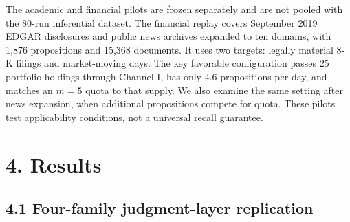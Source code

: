 \documentclass[
  conference,10pt]{IEEEtran}
\begin{document}
The academic and financial pilots are frozen separately and are not pooled with the 80-run inferential dataset. The financial replay covers September 2019 EDGAR disclosures and public news archives expanded to ten domains, with 1,876 propositions and 15,368 documents. It uses two targets: legally material 8-K filings and market-moving days. The key favorable configuration passes 25 portfolio holdings through Channel I, has only 4.6 propositions per day, and matches an \(m=5\) quota to that supply. We also examine the same setting after news expansion, when additional propositions compete for quota. These pilots test applicability conditions, not a universal recall guarantee.

\section{4. Results}\label{results}

\subsection{4.1 Four-family judgment-layer replication}\label{four-family-judgment-layer-replication}

\begin{table}[t]
\centering
\footnotesize
\setlength{\tabcolsep}{3pt}
\caption{Table 1. Frozen four-family mechanistic results. Recall intervals are run-level bootstrap 95\% CIs; \(\Delta\)value is descriptive.}
\end{table}
\end{document}
